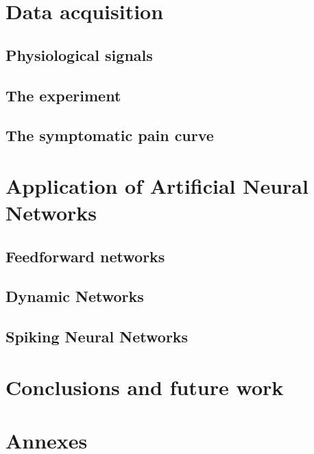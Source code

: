 \documentclass[a4paper,10pt,english]{report} %
\begin{document}
\chapter{Data acquisition}

\section{Physiological signals}

\section{The experiment}

\section{The symptomatic pain curve}


\chapter{Application of Artificial Neural Networks}

\section{Feedforward networks}

\section{Dynamic Networks}

\section{Spiking Neural Networks}


\chapter{Conclusions and future work}

\chapter*{Annexes}






\cleardoublepage
\end{document}
